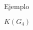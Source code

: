 \documentclass[final,xcolor=svgnames]{beamer}
\DeclareMathOperator{\sgn}{sgn}
\begin{document}
\begin{frame}{}
\begin{columns}
\begin{column}{0.5\textwidth}
\begin{block}{Ejemplo}
\begin{minipage}{0.3\linewidth}
            $K(G_{4})$
                  \end{minipage}
      \end{block}
    \end{column}

    \begin{column}{0.5\textwidth}
      
        
        

\end{column}
\end{columns}
\end{frame}
\end{document}
